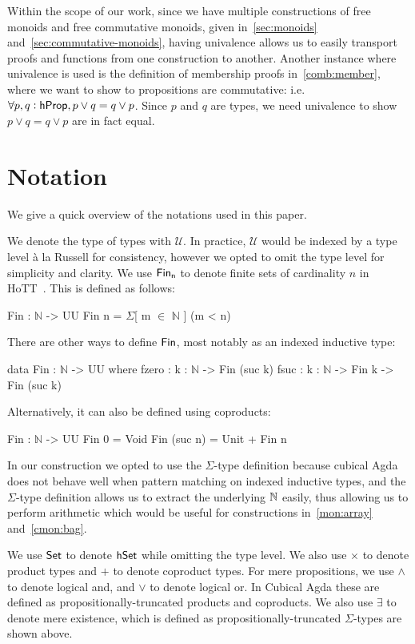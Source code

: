 Within the scope of our work, since we have multiple constructions of free monoids
and free commutative monoids, given in~\cref{sec:monoids} and~\cref{sec:commutative-monoids},
having univalence allows us to easily transport proofs and functions from one construction to another.
Another instance where univalence is used is the definition of membership proofs in~\cref{comb:member},
where we want to show to propositions are commutative: i.e. $\forall p, q: \mathsf{hProp}, p \vee q = q \vee p$.
Since $p$ and $q$ are types, we need univalence to show $p \vee q = q \vee p$ are in fact equal.

\section{Notation}\label{sec:notation}
We give a quick overview of the notations used in this paper.

We denote the type of types with $\mathcal{U}$. 
In practice, $\mathcal{U}$ would be indexed by a type level 
à la Russell for consistency, however we opted to omit the type level
for simplicity and clarity.
We use $\Fin[n]$ to denote finite sets of cardinality $n$ in HoTT~\cite{yorgeyCombinatorialSpeciesLabelled2014a}.
This is defined as follows:

\begin{code}
Fin : $\mathbb{N}$ -> UU
Fin n = $\Sigma$[ m $\in$ $\mathbb{N}$ ] (m < n)
\end{code}

There are other ways to define $\Fin$, most notably as an indexed inductive type:
\begin{code}
data Fin : $\mathbb{N}$ -> UU where
    fzero : {k : $\mathbb{N}$} -> Fin (suc k)
    fsuc : {k : $\mathbb{N}$} -> Fin k -> Fin (suc k)
\end{code}

Alternatively, it can also be defined using coproducts:
\begin{code}
Fin : $\mathbb{N}$ -> UU
Fin 0 = Void
Fin (suc n) = Unit + Fin n
\end{code}

In our construction we opted to use the $\Sigma$-type definition
because cubical Agda does not behave well
when pattern matching on indexed inductive types,
and the $\Sigma$-type definition allows us to extract the underlying
$\mathbb{N}$ easily, thus allowing us to perform arithmetic which would be
useful for constructions in~\cref{mon:array} and~\cref{cmon:bag}.

We use $\operatorname{\mathsf{Set}}$ to denote $\mathsf{hSet}$ while omitting the type level.
We also use $\times$ to denote product types and $+$ to denote coproduct types.
For mere propositions, we use $\land$ to denote logical and, and $\vee$ to denote logical or.
In Cubical Agda these are defined as propositionally-truncated products and coproducts.
We also use $\exists$ to denote mere existence, which is defined as
propositionally-truncated $\Sigma$-types are shown above.